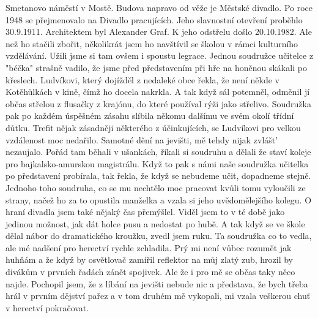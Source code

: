 
Smetanovo náměstí v Mostě. Budova napravo od věže je Městské divadlo.
Po roce 1948 se přejmenovalo na Divadlo pracujících. Jeho slavnostní
otevření proběhlo 30.9.1911. Architektem byl Alexander Graf. K jeho
odstřelu došlo 20.10.1982. Ale než ho stačili zbořit, několikrát jsem
ho navštívil se školou v rámci kulturního vzdělávání. Užili jsme si
tam ovšem i spoustu legrace. Jednou soudružce učitelce z "béčka"
strašně vadilo, že jsme před představením při hře na honěnou skákali
po křeslech. Ludvíkovi, který dojížděl z nedaleké obce řekla, že není
někde v Kotěhůlkách v kině, čímž ho docela nakrkla. A tak když sál
potemněl, odměnil jí občas střelou z flusačky z krajónu, do které
používal rýži jako střelivo. Soudružka pak po každém úspěšném zásahu
slíbila někomu dalšímu ve svém okolí třídní důtku. Trefit nějak
zásadněji některého z účinkujících, se Ludvíkovi pro velkou vzdálenost
moc nedařilo. Samotné dění na jevišti, mě tehdy nijak zvlášt'
nezaujalo. Pořád tam běhali v ušankách, říkali si soudruhu a dělali že
staví koleje pro bajkalsko-amurskou magistrálu. Když to pak s námi
naše soudružka učitelka po představení probírala, tak řekla, že když
se nebudeme učit, dopadneme stejně. Jednoho toho soudruha, co se mu
nechtělo moc pracovat kvůli tomu vyloučili ze strany, načež ho za to
opustila manželka a vzala si jeho uvědomělejšího kolegu. O hraní
divadla jsem také nějaký čas přemýšlel. Viděl jsem to v té době jako
jedinou možnost, jak dát holce pusu a nedostat po hubě. A tak když se
ve škole dělal nábor do dramatického kroužku, zvedl jsem ruku. Ta
soudružka co to vedla, ale mé nadšení pro herectví rychle zchladila.
Prý mi není vůbec rozumět jak huhňám a že když by osvětlovač zamířil
reflektor na můj zlatý zub, hrozil by divákům v prvních řadách zánět
spojivek. Ale že i pro mě se občas taky něco najde. Pochopil jsem, že
z líbání na jevišti nebude nic a představa, že bych třeba hrál v
prvním dějství pařez a v tom druhém mě vykopali, mi vzala veškerou
chuť v herectví pokračovat.
